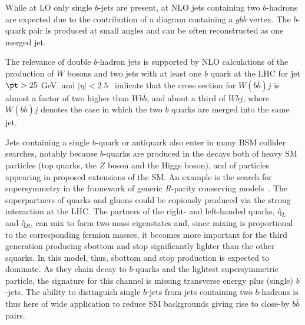 While at LO only single $b$-jets are present, at NLO jets containing two $b$-hadrons are expected due to the contribution of a diagram containing a $gb\bar{b}$ vertex. The $b$-quark pair is produced at small angles and can be often reconstructed as one merged jet.




The relevance of double $b$-hadron jets is supported by NLO calculations of the production of $W$ bosons and two jets with at least one $b$ quark at the LHC for jet $\pt > 25$ GeV, and $|\eta| < 2.5$~\cite{Campbell:2006} indicate that the cross section for $W(b\bar{b})j$ is almost a factor of two higher than $Wb\bar{b}$, and about a third of $Wbj$, where  $W(b\bar{b})j$ denotes the case in which the two $b$ quarks are merged into the same jet. 

Jets containing a single $b$-quark or antiquark %
also enter in many BSM collider searches, notably because $b$-quarks are produced in the decays both of heavy SM particles (top quarks, the $Z$ boson and the Higgs boson), and of particles appearing in proposed extensions of the SM.  %
 An example is the search for supersymmetry in the framework of generic $R$-parity conserving models~\cite{ATLAS-CONF-2011-098}. The superpartners of quarks and gluons could be copiously produced via the strong interaction at the LHC. The partners of the right- and left-handed quarks, \~{q}$_{L}$ and  \~{q}$_{R}$, can mix to form two mass eigenstates and, since mixing is proportional to the corresponding fermion masses, it becomes more important for the third generation producing sbottom and stop significantly lighter than the other squarks. In this model, thus, sbottom and stop production is expected to dominate. As they chain decay to $b$-quarks and the lightest supersymmetric particle, the signature for this channel is missing transverse energy %
plus (single) $b$-jets. The ability to distinguish single $b$-jets from jets containing two $b$-hadrons is thus here of wide application to reduce SM backgrounds giving rise to close-by $b\bar{b}$ pairs. %


